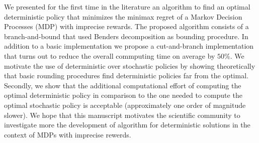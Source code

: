 We presented for the first time in the literature an algorithm to find an optimal deterministic policy that minimizes the minimax regret of a Markov Decision Processes (MDP) with imprecise rewards.
The proposed algorithm consists of a branch-and-bound that used Benders decomposition as bounding procedure. In addition to a basic implementation we propose a cut-and-branch implementation that turns out to reduce the overall commputing time on average by $50\%$.  
We motivate the use of deterministic over stochastic policies by showing theoretically that basic rounding procedures find deterministic policies far from the optimal. Secondly, we show that the additional computational effort of computing the optimal deterministic policy in comparison to the one needed to compute the optimal stochastic policy is acceptable (approximately one order of magnitude slower).
We hope that this manuscript motivates the scientific community to investigate more the development of algorithm for deterministic solutions in the context of MDPs with imprecise rewerds. 
